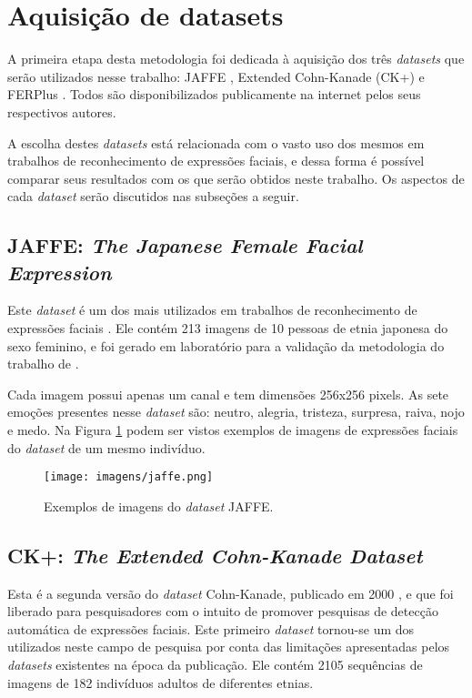 \documentclass[
12pt,       %
openright,      %
oneside,      %
a4paper,      %
english,      %
french,       %
spanish,      %
brazil        %
]{abntex2}
\begin{document}
\section{Aquisição de datasets} \label{aquisicao}

A primeira etapa desta metodologia foi dedicada à aquisição dos três \textit{datasets} que serão utilizados nesse trabalho: JAFFE \cite{lyons1998coding}, Extended Cohn-Kanade (CK+) \cite{lucey2010extended} e FERPlus \cite{Barsoum2016}. Todos são disponibilizados publicamente na internet pelos seus respectivos autores.

A escolha destes \textit{datasets} está relacionada com o vasto uso dos mesmos em trabalhos de reconhecimento de expressões faciais, e dessa forma é possível comparar seus resultados com os que serão obtidos neste trabalho. Os aspectos de cada \textit{dataset} serão discutidos nas subseções a seguir.

\subsection{JAFFE: \textit{The Japanese Female Facial Expression}} \label{jaffe}

Este \textit{dataset} é um dos mais utilizados em trabalhos de reconhecimento de expressões faciais \cite{shan2009facial, sarode2010facial, shanli2018}. Ele contém 213 imagens de 10 pessoas de etnia japonesa do sexo feminino, e foi gerado em laboratório para a validação da metodologia do trabalho de .

Cada imagem possui apenas um canal e tem dimensões 256x256 pixels. As sete emoções presentes nesse \textit{dataset} são: neutro, alegria, tristeza, surpresa, raiva, nojo e medo. Na Figura \ref{fig:jaffe} podem ser vistos exemplos de imagens de expressões faciais do \textit{dataset} de um mesmo indivíduo.

\begin{figure}[ht]
\centering
\caption{Exemplos de imagens do \textit{dataset} JAFFE.}
\texttt{[image: imagens/jaffe.png]}
\label{fig:jaffe}
\end{figure}

\subsection{CK+: \textit{The Extended Cohn-Kanade Dataset}} \label{ck+}

Esta é a segunda versão do \textit{dataset} Cohn-Kanade, publicado em 2000 \cite{kanade2000comprehensive}, e que foi liberado para pesquisadores com o intuito de promover pesquisas de detecção automática de expressões faciais. Este primeiro \textit{dataset} tornou-se um dos utilizados neste campo de pesquisa por conta das limitações apresentadas pelos \textit{datasets} existentes na época da publicação. Ele contém 2105 sequências de imagens de 182 indivíduos adultos de diferentes etnias.
\end{document}
